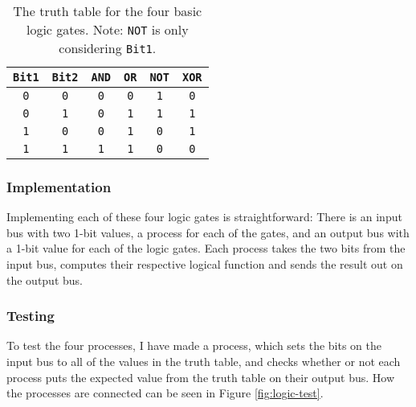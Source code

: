 \begin{table}
    \centering
    \begin{tabular}{cc|cccc}
        \toprule
        \texttt{Bit1} & \texttt{Bit2} & \texttt{AND} & \texttt{OR} &
        \texttt{NOT} & \texttt{XOR} \\
        \midrule
        \texttt{0} & \texttt{0} & \texttt{0} & \texttt{0} & \texttt{1} &
            \texttt{0} \\
        \texttt{0} & \texttt{1} & \texttt{0} & \texttt{1} & \texttt{1} &
            \texttt{1} \\
        \texttt{1} & \texttt{0} & \texttt{0} & \texttt{1} & \texttt{0} &
            \texttt{1} \\
        \texttt{1} & \texttt{1} & \texttt{1} & \texttt{1} & \texttt{0} &
            \texttt{0} \\
        \bottomrule
    \end{tabular}
    \caption{The truth table for the four basic logic gates. Note: \texttt{NOT}
    is only considering \texttt{Bit1}.}
    \label{tab:truth-table}
\end{table}

\subsubsection*{Implementation}
Implementing each of these four logic gates is straightforward: There is an
input bus with two 1-bit values, a process for each of the gates, and an output
bus with a 1-bit value for each of the logic gates. Each process takes the two
bits from the input bus, computes their respective logical function and sends
the result out on the output bus.
%

\subsubsection*{Testing}
To test the four processes, I have made a process, which sets the bits on the
input bus to all of the values in the truth table, and checks whether or not
each process puts the expected value from the truth table on their output bus.
How the processes are connected can be seen in Figure \ref{fig:logic-test}.

